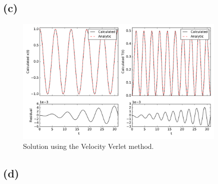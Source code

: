 \documentclass[12pt]{article}
\begin{document}
\subsection*{(c)}



\begin{figure}[ht]
    \centering
    \includegraphics[width=0.9\textwidth]{velverlet}
    \caption{Solution using the Velocity Verlet method.}
    \label{fig:velverlet}
\end{figure}

\subsection*{(d)}
\end{document}
